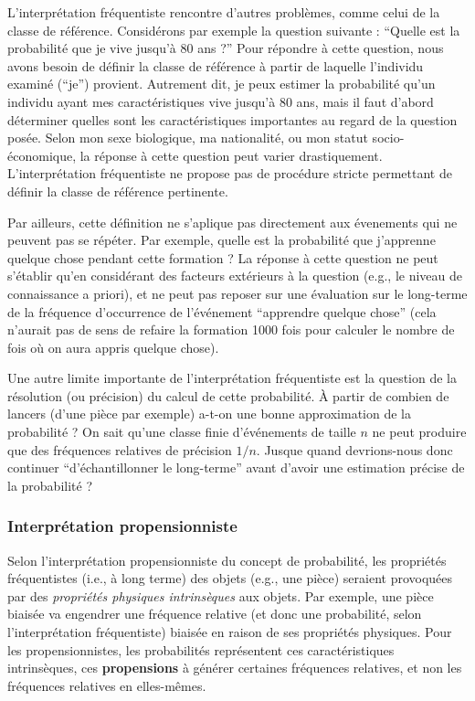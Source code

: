 \documentclass[
  a4paper,11pt,twoside,onecolumn,openright,final,oldfontcommands]{memoir}
\theoremstyle{definition}
\theoremstyle{definition}
\theoremstyle{definition}
\theoremstyle{remark}
\begin{document}
L'interprétation fréquentiste rencontre d'autres problèmes, comme celui de la classe de référence. Considérons par exemple la question suivante : ``Quelle est la probabilité que je vive jusqu'à 80 ans ?'' Pour répondre à cette question, nous avons besoin de définir la classe de référence à partir de laquelle l'individu examiné (``je'') provient. Autrement dit, je peux estimer la probabilité qu'un individu ayant mes caractéristiques vive jusqu'à 80 ans, mais il faut d'abord déterminer quelles sont les caractéristiques importantes au regard de la question posée. Selon mon sexe biologique, ma nationalité, ou mon statut socio-économique, la réponse à cette question peut varier drastiquement. L'interprétation fréquentiste ne propose pas de procédure stricte permettant de définir la classe de référence pertinente.

Par ailleurs, cette définition ne s'aplique pas directement aux évenements qui ne peuvent pas se répéter. Par exemple, quelle est la probabilité que j'apprenne quelque chose pendant cette formation ? La réponse à cette question ne peut s'établir qu'en considérant des facteurs extérieurs à la question (e.g., le niveau de connaissance a priori), et ne peut pas reposer sur une évaluation sur le long-terme de la fréquence d'occurrence de l'événement ``apprendre quelque chose'' (cela n'aurait pas de sens de refaire la formation 1000 fois pour calculer le nombre de fois où on aura appris quelque chose).

Une autre limite importante de l'interprétation fréquentiste est la question de la résolution (ou précision) du calcul de cette probabilité. À partir de combien de lancers (d'une pièce par exemple) a-t-on une bonne approximation de la probabilité ? On sait qu'une classe finie d'événements de taille \(n\) ne peut produire que des fréquences relatives de précision \(1/n\). Jusque quand devrions-nous donc continuer ``d'échantillonner le long-terme'' avant d'avoir une estimation précise de la probabilité ?

\hypertarget{interpruxe9tation-propensionniste}{%
\subsubsection{Interprétation propensionniste}\label{interpruxe9tation-propensionniste}}

Selon l'interprétation propensionniste du concept de probabilité, les propriétés fréquentistes (i.e., à long terme) des objets (e.g., une pièce) seraient provoquées par des \emph{propriétés physiques intrinsèques} aux objets. Par exemple, une pièce biaisée va engendrer une fréquence relative (et donc une probabilité, selon l'interprétation fréquentiste) biaisée en raison de ses propriétés physiques. Pour les propensionnistes, les probabilités représentent ces caractéristiques intrinsèques, ces \textbf{propensions} à générer certaines fréquences relatives, et non les fréquences relatives en elles-mêmes.
\end{document}
